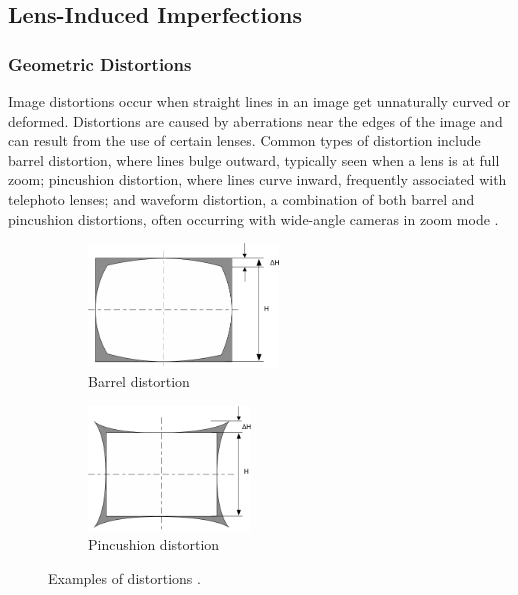 \subsection{Lens-Induced Imperfections}

\subsubsection{Geometric Distortions}
Image distortions occur when straight lines in an image get unnaturally curved or deformed. Distortions are caused by aberrations near the edges of the image and can result from the use of certain lenses. Common types of distortion include barrel distortion, where lines bulge outward, typically seen when a lens is at full zoom; pincushion distortion, where lines curve inward, frequently associated with telephoto lenses; and waveform distortion, a combination of both barrel and pincushion distortions, often occurring with wide-angle cameras in zoom mode \cite{distortions}.

\begin{figure}[htbp]
  \centering
  \begin{subfigure}[b]{0.45\textwidth}
    \centering
    \includegraphics[height=3.3cm]{Images/barrel_distortion.png}
    \caption{Barrel distortion}
    \label{fig:barrel}
  \end{subfigure}
  \hfill
  \begin{subfigure}[b]{0.45\textwidth}
    \centering
    \includegraphics[height=3.3cm]{Images/pincushion_distortion.png}
    \caption{Pincushion distortion}
    \label{fig:pincushion}
  \end{subfigure}
  \caption{Examples of distortions \cite{distortions}.}
  \label{fig:distortions}
\end{figure}

